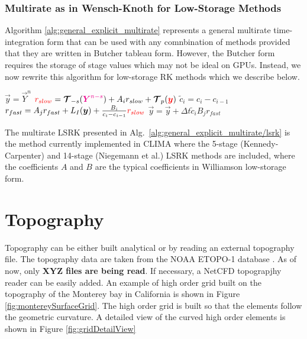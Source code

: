 \documentclass{report}
\begin{document}
\subsubsection{Multirate as in Wensch-Knoth for Low-Storage Methods}
Algorithm \ref{alg:general_explicit_multirate} represents a general multirate time-integration form that can be used with any comnbination of methods provided that they are written in Butcher tableau form.  However, the Butcher form requires the storage of stage values which may not be ideal on GPUs. Instead, we now rewrite this algorithm for low-storage RK methods which we describe below.
\begin{algorithm}
\label{alg:general_explicit_multirate/lsrk}
\begin{algorithmic}
\State
{}
\State $\vec{y}=\vec{Y}^n$ 
\State $\textcolor{red}{r_{slow}}=\boldsymbol{{\mathcal{T}}}_{-s}(\textcolor{magenta}{ \boldsymbol{{Y}}^{n-s}}) + A_i r_{slow} + \boldsymbol{{\mathcal{T}}}_{p}(\textcolor{red}{\boldsymbol{{y}}})$
\State $\widetilde{c}_i=c_i - c_{i-1}$
\State $r_{fast}=A_j r_{fast} + L_I(\boldsymbol{{y}}) + \frac{B_i}{c_i - c_{i-1}} \textcolor{red}{r_{slow}}$ 
\State $\vec{y} = \vec{y} + \Delta t \widetilde{c}_i  B_j r_{fast}$
\EndFor %
\EndFor %
\EndFunction
\end{algorithmic}
\end{algorithm}
The multirate LSRK presented in Alg.\  \ref{alg:general_explicit_multirate/lsrk} is the method currently implemented in CLIMA where the 5-stage (Kennedy-Carpenter) and 14-stage (Niegemann et al.) LSRK methods are included, where the coefficients $A$ and $B$ are the typical coefficients in Williamson low-storage form.

\section{Topography}
Topography can be either built analytical or by reading an external topography file. The topography data are taken from the NOAA ETOPO-1 database \cite{etopo1}. As of now, only {\bf XYZ files are being read}. If necessary, a NetCFD topograpjhy reader can be easily added.
An example of high order grid built on the topography of the Monterey bay in California is shown in Figure \ref{fig:montereySurfaceGrid}. The high order grid is built so that the elements follow the geometric curvature. A detailed view of the curved high order elements is shown in Figure \ref{fig:gridDetailView}
\end{document}
